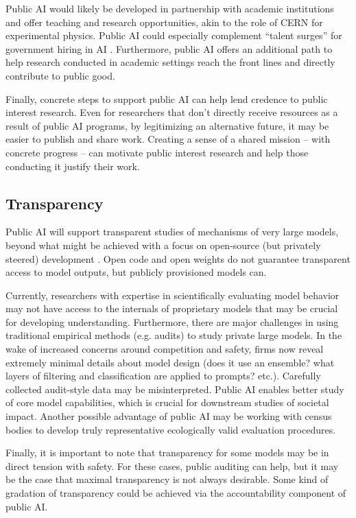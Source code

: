 \documentclass{article}
\begin{document}
Public AI would likely be developed in partnership with academic institutions and offer teaching and research opportunities, akin to the role of CERN for experimental physics. Public AI could especially complement ``talent surges'' for government hiring in AI \cite{thewhitehouseFACTSHEETPresident2023}. Furthermore, public AI offers an additional path to help research conducted in academic settings reach the front lines and directly contribute to public good. 

Finally, concrete steps to support public AI can help lend credence to public interest research. Even for researchers that don't directly receive resources as a result of public AI programs, by legitimizing an alternative future, it may be easier to publish and share work. Creating a sense of a shared mission -- with concrete progress -- can motivate public interest research and help those conducting it justify their work.

\subsection{Transparency} \label{sec:transparency}
Public AI will support transparent studies of mechanisms of very large models, beyond what might be achieved with a focus on open-source (but privately steered) development \cite{widderOpenBusinessBig2023}. Open code and open weights do not guarantee transparent access to model outputs, but publicly provisioned models can.

Currently, researchers with expertise in scientifically evaluating model behavior may not have access to the internals of proprietary models that may be crucial for developing understanding. Furthermore, there are major challenges in using traditional empirical methods (e.g. audits) to study private large models. In the wake of increased concerns around competition and safety, firms now reveal extremely minimal details about model design (does it use an ensemble? what layers of filtering and classification are applied to prompts? etc.). Carefully collected audit-style data may be misinterpreted. Public AI enables better study of core model capabilities, which is crucial for downstream studies of societal impact. Another possible advantage of public AI may be working with census bodies to develop truly representative ecologically valid evaluation procedures.

Finally, it is important to note that transparency for some models may be in direct tension with safety. For these cases, public auditing can help, but it may be the case that maximal transparency is not always desirable. Some kind of gradation of transparency could be achieved via the accountability component of public AI.
\end{document}
